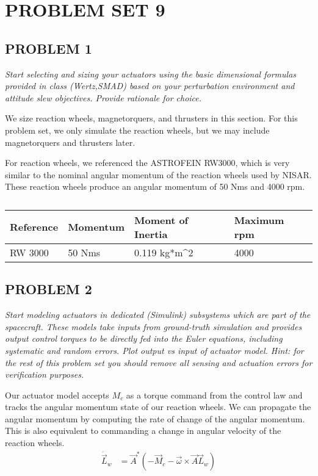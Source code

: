 \section{\Large PROBLEM SET 9}
\subsection{PROBLEM 1}
\textit{Start selecting and sizing your actuators using the basic dimensional formulas provided in class (Wertz,SMAD) based on your perturbation environment and attitude slew objectives. Provide rationale for choice.}

We size reaction wheels, magnetorquers, and thrusters in this section. For this problem set, we only simulate the reaction wheels, but we may include magnetorquers and thrusters later.

For reaction wheels, we referenced the ASTROFEIN RW3000, which is very similar to the nominal angular momentum of the reaction wheels used by NISAR. These reaction wheels produce an angular momentum of 50 Nms and 4000 rpm.

\begin{table}[H]
\begin{tabular}{|l|l|l|l|}
\hline
Reference & Momentum & Moment of Inertia             & Maximum rpm \\ \hline
RW 3000   & 50 Nms   & 0.119 kg*m\textasciicircum{}2 & 4000        \\ \hline
\end{tabular}
\caption{}
\end{table}



\subsection{PROBLEM 2}
\textit{Start modeling actuators in dedicated (Simulink) subsystems which are part of the spacecraft. These models take inputs from ground-truth simulation and provides output control torques to be directly fed into the Euler equations, including systematic and random errors. Plot output vs input of actuator model. Hint: for the rest of this problem set you should remove all sensing and actuation errors for verification purposes.}

Our actuator model accepts $M_{c}$ as a torque command from the control law and tracks the angular momentum state of our reaction wheels. We can propagate the angular momentum by computing the rate of change of the angular momentum. This is also equivalent to commanding a change in angular velocity of the reaction wheels.
\begin{align*}
    \Dot{\Vec{L}}_{w} &= \Vec{A}^{*} (-\Vec{M}_{c} - \Vec{\omega} \times \Vec{A} \Vec{L}_{w})
\end{align*}


